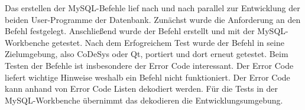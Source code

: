 Das erstellen der MySQL-Befehle lief nach und nach parallel zur Entwicklung der beiden User-Programme der Datenbank. Zunächst wurde die Anforderung an den Befehl festgelegt. Anschließend wurde der Befehl erstellt und mit der MySQL-Workbenche getestet. Nach dem Erfogreichem Test wurde der Befehl in seine Zielumgebung, also CoDeSys oder Qt, portiert und dort erneut getestet. Beim Testen der Befehle ist insbesondere der Error Code interessant. Der Error Code liefert wichtige Hinweise weshalb ein Befehl nicht funktioniert. Der Error Code kann anhand von Error Code Listen dekodiert werden. Für die Tests in der MySQL-Workbenche übernimmt das dekodieren die Entwicklungsumgebung.